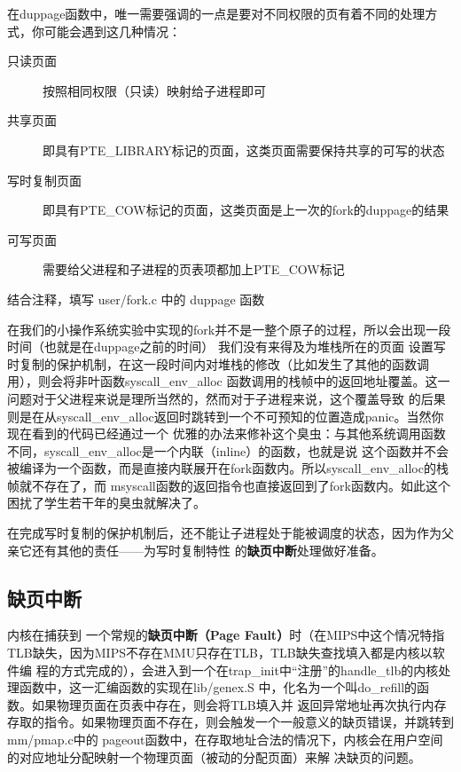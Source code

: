 在duppage函数中，唯一需要强调的一点是要对不同权限的页有着不同的处理方式，你可能会遇到这几种情况：
\begin{description}
 \item [只读页面] 按照相同权限（只读）映射给子进程即可
 \item [共享页面] 即具有PTE\_LIBRARY标记的页面，这类页面需要保持共享的可写的状态
 \item [写时复制页面] 即具有PTE\_COW标记的页面，这类页面是上一次的fork的duppage的结果
 \item [可写页面] 需要给父进程和子进程的页表项都加上PTE\_COW标记
\end{description}

\begin{exercise}
 结合注释，填写 user/fork.c 中的 duppage 函数
\end{exercise}

\begin{note}
在我们的小操作系统实验中实现的fork并不是一整个原子的过程，所以会出现一段时间（也就是在duppage之前的时间）
我们没有来得及为堆栈所在的页面
设置写时复制的保护机制，在这一段时间内对堆栈的修改（比如发生了其他的函数调用），则会将非叶函数syscall\_env\_alloc
函数调用的栈帧中的返回地址覆盖。这一问题对于父进程来说是理所当然的，然而对于子进程来说，这个覆盖导致
的后果则是在从syscall\_env\_alloc返回时跳转到一个不可预知的位置造成panic。当然你现在看到的代码已经通过一个
优雅的办法来修补这个臭虫：与其他系统调用函数不同，syscall\_env\_alloc是一个内联（inline）的函数，也就是说
这个函数并不会被编译为一个函数，而是直接内联展开在fork函数内。所以syscall\_env\_alloc的栈帧就不存在了，而
msyscall函数的返回指令也直接返回到了fork函数内。如此这个困扰了学生若干年的臭虫就解决了。
\end{note}

在完成写时复制的保护机制后，还不能让子进程处于能被调度的状态，因为作为父亲它还有其他的责任——为写时复制特性
的\textbf{缺页中断}处理做好准备。

\subsection{缺页中断}

内核在捕获到
一个常规的\textbf{缺页中断（Page Fault）}时（在MIPS中这个情况特指TLB缺失，因为MIPS不存在MMU只存在TLB，TLB缺失查找填入都是内核以软件编
程的方式完成的），会进入到一个在trap\_init中“注册”的handle\_tlb的内核处理函数中，这一汇编函数的实现在lib/genex.S
中，化名为一个叫do\_refill的函数。如果物理页面在页表中存在，则会将TLB填入并
返回异常地址再次执行内存存取的指令。如果物理页面不存在，则会触发一个一般意义的缺页错误，并跳转到mm/pmap.c中的
pageout函数中，在存取地址合法的情况下，内核会在用户空间的对应地址分配映射一个物理页面（被动的分配页面）来解
决缺页的问题。

